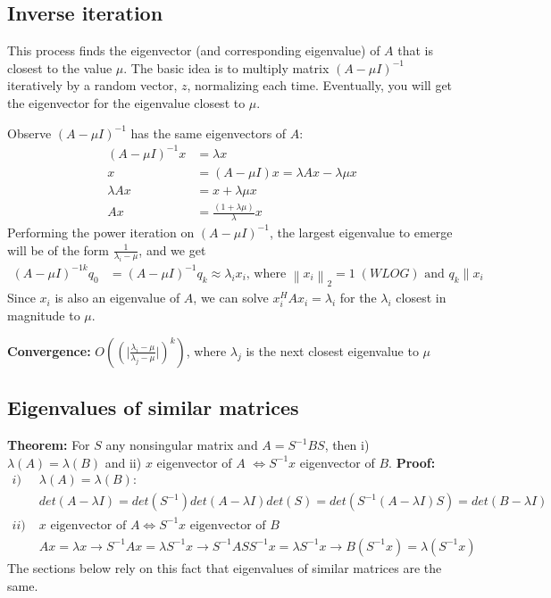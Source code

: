 \documentclass{article}
\newcommand{\norm}[2]{\left\lVert#1\right\rVert_#2}
\newcommand{\abs}[1]{\lvert#1\rvert}
\begin{document}
\subsection{Inverse iteration}
This process finds the eigenvector (and corresponding eigenvalue) of $A$ that is closest to the value $\mu$. The basic idea is to multiply matrix $(A - \mu I)^{-1}$ iteratively by a random vector, $z$, normalizing each time. Eventually, you will get the eigenvector for the eigenvalue closest to $\mu$.

Observe $(A - \mu I)^{-1}$ has the same eigenvectors of $A$:
\begin{align*}
    (A - \mu I)^{-1}x &= \lambda x\\
    x &= (A - \mu I)x = \lambda Ax - \lambda \mu x\\
    \lambda Ax &= x + \lambda \mu x\\
    Ax &= \frac{(1 + \lambda \mu)}{\lambda}x
\end{align*}
Performing the power iteration on $(A - \mu I)^{-1}$, the largest eigenvalue to emerge will be of the form $\frac{1}{\lambda_i - \mu}$, and we get
\begin{align*}
    (A - \mu I)^{-1k}q_0 &= (A - \mu I)^{-1}q_{k} \approx \lambda_i x_i \textrm{, where } \norm{x_i}{2} = 1 \; (WLOG) \textrm{ and } q_k \parallel x_i
\end{align*}
Since $x_i$ is also an eigenvalue of $A$, we can solve $x_i^HAx_i = \lambda_i$ for the $\lambda_i$ closest in magnitude to $\mu$.

\textbf{Convergence: } $O((\abs{\frac{\lambda_i - \mu}{\lambda_j - \mu}})^k)$, where $\lambda_j$ is the next closest eigenvalue to $\mu$

\subsection{Eigenvalues of similar matrices}
\textbf{Theorem:} For $S$ any nonsingular matrix and $A = S^{-1}BS$, then i) $\lambda(A) = \lambda(B)$ and ii) $x$ eigenvector of $A$ $\Leftrightarrow S^{-1}x$ eigenvector of $B$. \textbf{Proof:}
\begin{align*}
    i) \; &\lambda(A) = \lambda(B):\\
    &det(A - \lambda I) = det(S^{-1})det(A - \lambda I)det(S) = det(S^{-1}(A - \lambda I)S) = det(B - \lambda I)\\
    ii) \;& \textrm{$x$ eigenvector of $A \Leftrightarrow S^{-1}x$ eigenvector of $B$}\\
    &Ax = \lambda x \rightarrow S^{-1}Ax = \lambda S^{-1}x \rightarrow S^{-1}ASS^{-1}x = \lambda S^{-1}x \rightarrow B(S^{-1}x) = \lambda (S^{-1}x)
\end{align*}
The sections below rely on this fact that eigenvalues of similar matrices are the same.
\end{document}
